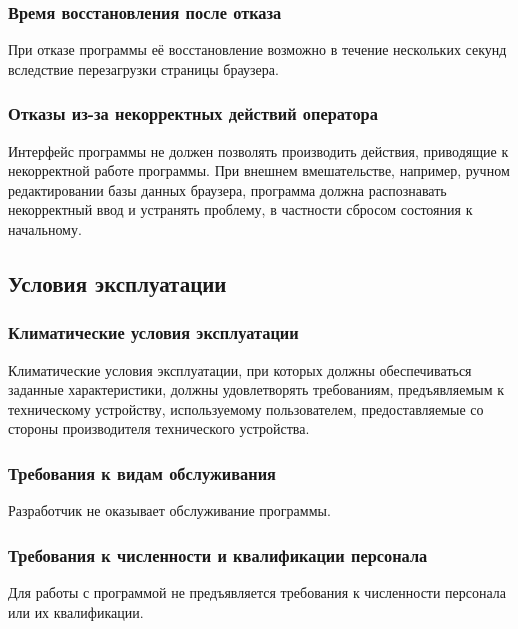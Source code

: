 \documentclass[a4paper, 12pt]{article}
\begin{document}
	\subsubsection{Время восстановления после отказа}\label{section:4.3.2}
	При отказе программы её восстановление возможно в течение нескольких секунд вследствие перезагрузки страницы браузера.

	\subsubsection{Отказы из-за некорректных действий оператора}\label{section:4.3.3}
	Интерфейс программы не должен позволять производить действия, приводящие к некорректной работе программы. При внешнем вмешательстве,
	например, ручном редактировании базы данных браузера, программа должна распознавать некорректный ввод и устранять
	проблему, в частности сбросом состояния к начальному.

	\subsection{Условия эксплуатации}\label{section:4.4}

	\subsubsection{Климатические условия эксплуатации}\label{section:4.4.1}
	Климатические условия эксплуатации, при которых должны обеспечиваться заданные характеристики, должны удовлетворять
	требованиям, предъявляемым к техническому устройству, используемому пользователем, предоставляемые со стороны производителя
	технического устройства.

	\subsubsection{Требования к видам обслуживания}\label{section:4.4.2}
	Разработчик не оказывает обслуживание программы.

	\subsubsection{Требования к численности и квалификации персонала}\label{section:4.4.3}
	Для работы с программой не предъявляется требования к численности персонала или их квалификации.
\end{document}
